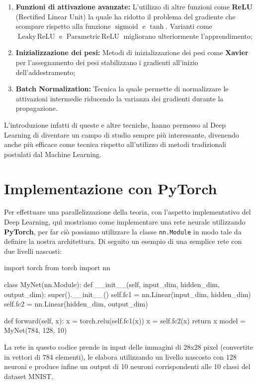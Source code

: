 \begin{enumerate}
    \item \textbf{Funzioni di attivazione avanzate:} L'utilizzo di altre funzioni come \textbf{ReLU} (Rectified Linear Unit) la quale ha ridotto il problema del gradiente che scompare rispetto alla funzione $\operatorname{sigmoid}$ e $\operatorname{tanh}$. Varianti come $\operatorname{Leaky\,ReLU}$ e $\operatorname{Parametric\,ReLU}$ migliorano ulteriormente l'apprendimento;
    \item \textbf{Inizializzazione dei pesi:} Metodi di inizializzazione dei pesi come \textbf{Xavier} per l'assegnamento dei pesi stabilizzano i gradienti all'inizio dell'addestramento;
    \item \textbf{Batch Normalization:} Tecnica la quale permette di normalizzare le attivazioni intermedie riducendo la varianza dei gradienti durante la propagazione.
\end{enumerate}

L'introduzione infatti di queste e altre tecniche, hanno permesso al Deep Learning di diventare un campo di studio sempre più interessante, divenendo anche più efficace come tecnica rispetto all'utilizzo di metodi tradizionali postulati dal Machine Learning.

\section{Implementazione con PyTorch}
Per effettuare una parallelizzazione della teoria, con l'aspetto implementativo del Deep Learning, quì mostriamo come implementare una rete neurale utilizzando \textbf{PyTorch}, per far ciò possiamo utilizzare la classe \texttt{nn.Module} in modo tale da definire la nostra architettura. Di seguito un esempio di una semplice rete con due livelli nascosti:
\\
\begin{python}[frame=trBL]
    import torch
    from torch import nn

    class MyNet(nn.Module):
        def __init__(self, input_dim, hidden_dim, output_dim):
            super().__init__()
            self.fc1 = nn.Linear(input_dim, hidden_dim)
            self.fc2 = nn.Linear(hidden_dim, output_dim)
    
        def forward(self, x):
            x = torch.relu(self.fc1(x))
            x = self.fc2(x)
            return x
    model = MyNet(784, 128, 10)
\end{python}
\vspace{0.5em}
La rete in questo codice prende in input delle immagini di 28x28 pixel (convertite in vettori di 784 elementi), le elabora utilizzando un livello nascosto con 128 neuroni e produce infine un output di 10 neuroni corrispondenti alle 10 classi del dataset MNIST.